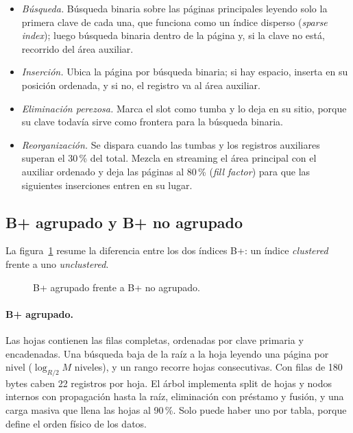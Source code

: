 \documentclass[11pt,a4paper]{article}
\begin{document}
\begin{itemize}
  \item \emph{Búsqueda.} Búsqueda binaria sobre las páginas principales leyendo solo la primera clave de cada una, que funciona como un índice disperso (\emph{sparse index}); luego búsqueda binaria dentro de la página y, si la clave no está, recorrido del área auxiliar.
  \item \emph{Inserción.} Ubica la página por búsqueda binaria; si hay espacio, inserta en su posición ordenada, y si no, el registro va al área auxiliar.
  \item \emph{Eliminación perezosa.} Marca el slot como tumba y lo deja en su sitio, porque su clave todavía sirve como frontera para la búsqueda binaria.
  \item \emph{Reorganización.} Se dispara cuando las tumbas y los registros auxiliares superan el 30\,\% del total. Mezcla en streaming el área principal con el auxiliar ordenado y deja las páginas al 80\,\% (\emph{fill factor}) para que las siguientes inserciones entren en su lugar.
\end{itemize}

\subsection{B+ agrupado y B+ no agrupado}

La figura~\ref{fig:bplus} resume la diferencia entre los dos índices B+: un índice \emph{clustered} frente a uno \emph{unclustered}.

\begin{figure}[!htbp]
\centering

\caption{B+ agrupado frente a B+ no agrupado.}
\label{fig:bplus}
\end{figure}

\paragraph{B+ agrupado.} Las hojas contienen las filas completas, ordenadas por clave primaria y encadenadas. Una búsqueda baja de la raíz a la hoja leyendo una página por nivel ($\log_{R/2} M$ niveles), y un rango recorre hojas consecutivas. Con filas de 180 bytes caben 22 registros por hoja. El árbol implementa split de hojas y nodos internos con propagación hasta la raíz, eliminación con préstamo y fusión, y una carga masiva que llena las hojas al 90\,\%. Solo puede haber uno por tabla, porque define el orden físico de los datos.
\end{document}
